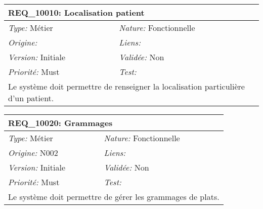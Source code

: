 \begin{table}[!ht]

\begin{tabular}{|p{60mm}p{100mm}|}

\hline

\multicolumn{2}{|l|}{\textbf{REQ\_10010:} Localisation patient} \\ \hline

\emph{Type:} Métier & \emph{Nature:} Fonctionnelle \\

\emph{Origine:}  & \emph{Liens:}  \\

\emph{Version:} Initiale & \emph{Validée:} Non \\

\emph{Priorité:} Must & \emph{Test:} \\ \hline

\multicolumn{2}{|p{16cm}|}{Le système doit permettre de renseigner la localisation particulière d'un patient.} \\ \hline

\end{tabular}

\end{table}



\begin{table}[!ht]

\begin{tabular}{|p{60mm}p{100mm}|}

\hline

\multicolumn{2}{|l|}{\textbf{REQ\_10020:} Grammages} \\ \hline

\emph{Type:} Métier & \emph{Nature:} Fonctionnelle \\

\emph{Origine:} N002 & \emph{Liens:}  \\

\emph{Version:} Initiale & \emph{Validée:} Non \\

\emph{Priorité:} Must & \emph{Test:} \\ \hline

\multicolumn{2}{|p{16cm}|}{Le système doit permettre de gérer les grammages de plats.} \\ \hline

\end{tabular}

\end{table}



